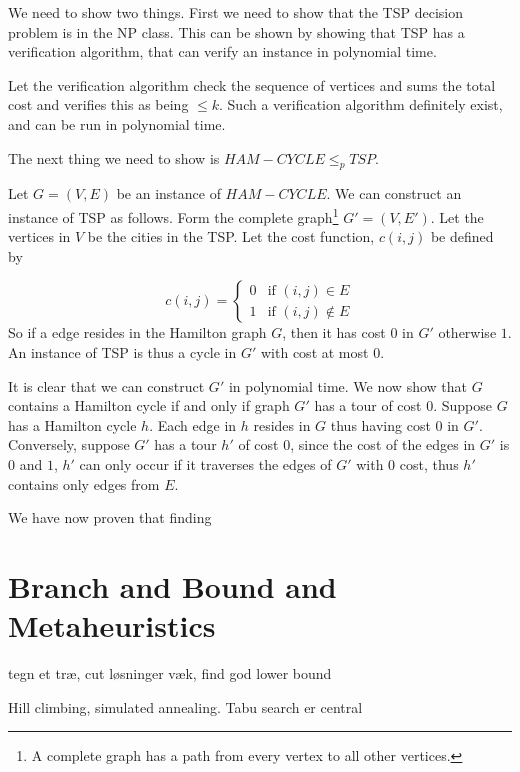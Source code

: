 \documentclass[10pt]{article}
\begin{document}
We need to show two things. First we need to show that the TSP decision problem is in the NP class. This can be shown by showing that TSP has a verification algorithm, that can verify an instance in polynomial time. 

Let the verification algorithm check the sequence of vertices and sums the total cost and verifies this as being $\leq k$. Such a verification algorithm definitely exist, and can be run in polynomial time.

The next thing we need to show is $HAM-CYCLE \leq_p TSP$. 

Let $G=(V,E)$ be an instance of $HAM-CYCLE$. We can construct an instance of TSP as follows. Form the complete graph\footnote{A complete graph has a path from every vertex to all other vertices.} $G' = (V,E')$. Let the vertices in $V$ be the cities in the TSP. Let the cost function, $c(i,j)$ be defined by

\begin{equation} 
c(i,j) = 
\left\{
\begin{array}{rl} 
  0 & \text{if } (i,j) \in E \\
  1 & \text{if } (i,j) \notin E 
\end{array} 
\right. 
\end{equation} 
So if a edge resides in the Hamilton graph $G$, then it has cost $0$ in $G'$ otherwise $1$. An instance of TSP is thus a cycle in $G'$ with cost at most $0$.

It is clear that we can construct $G'$ in polynomial time. We now show that $G$ contains a Hamilton cycle if and only if graph $G'$ has a tour of cost $0$. Suppose $G$ has a Hamilton cycle $h$. Each edge in $h$ resides in $G$ thus having cost $0$ in $G'$. Conversely, suppose $G'$ has a tour $h'$ of cost $0$, since the cost of the edges in $G'$ is $0$ and $1$, $h'$ can only occur if it traverses the edges of $G'$ with $0$ cost, thus $h'$ contains only edges from $E$.  


We have now proven that finding 

\clearpage \newpage
\section{Branch and Bound and Metaheuristics} %
\label{sec:branch_and_bound_and_metaheuristics}

tegn et træ, cut løsninger væk, find god lower bound


Hill climbing, simulated annealing. Tabu search er central
\end{document}
